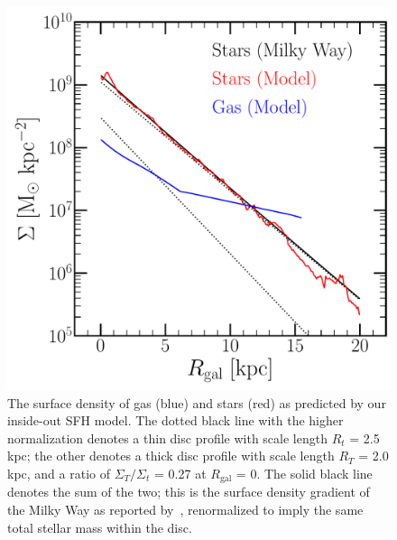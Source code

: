 \documentclass[fleqn, usenatbib]{mnras}
\begin{document}
\begin{figure} 
\centering 
\includegraphics[scale = 0.45]{surface_density_gradient.pdf} 
\caption{The surface density of gas (blue) and stars (red) as predicted by our 
inside-out SFH model. The dotted black line with the higher normalization 
denotes a thin disc profile with scale length $R_t$ = 2.5 kpc; the other 
denotes a thick disc profile with scale length $R_T$ = 2.0 kpc, and a ratio of 
$\Sigma_T/\Sigma_t$ = 0.27 at $R_\text{gal}$ = 0. The solid black line denotes 
the sum of the two; this is the surface density gradient of the Milky Way as 
reported by~\citet{Bland-Hawthorn2016}, renormalized to imply the same total 
stellar mass within the disc. } 
\label{fig:surface_density} 
\end{figure} 
\end{document}
